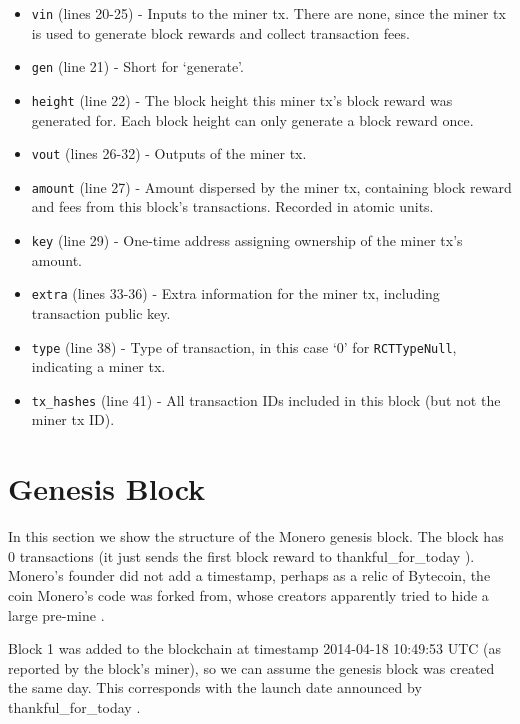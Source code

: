 \begin{appendices}
\begin{itemize}
    \item {\tt vin} (lines 20-25) - Inputs to the miner tx. There are none, since the miner tx is used to generate block rewards and collect transaction fees.
    \item {\tt gen} (line 21) - Short for `generate'.
    \item {\tt height} (line 22) - The block height this miner tx's block reward was generated for. Each block height can only generate a block reward once.
    \item {\tt vout} (lines 26-32) - Outputs of the miner tx.
    \item {\tt amount} (line 27) - Amount dispersed by the miner tx, containing block reward and fees from this block's transactions. Recorded in atomic units.
    \item {\tt key} (line 29) - One-time address assigning ownership of the miner tx's amount.
    \item {\tt extra} (lines 33-36) - Extra information for the miner tx, including transaction public key.
    \item {\tt type} (line 38) - Type of transaction, in this case `0' for {\tt RCTTypeNull}, indicating a miner tx.
    \item {\tt tx\_hashes} (line 41) - All transaction IDs included in this block (but not the miner tx ID).
\end{itemize}




\chapter{Genesis Block}
\label{appendix:genesis-block}

In this section we show the structure of the Monero genesis block. The block has 0 transactions (it just sends the first block reward to thankful\_for\_today \cite{bitmonero-launched}). Monero's founder did not add a timestamp, perhaps as a relic of Bytecoin, the coin Monero's code was forked from, whose creators apparently tried to hide a large pre-mine \cite{monero-history}.

Block 1 was added to the blockchain at timestamp 2014-04-18 10:49:53 UTC (as reported by the block's miner), so we can assume the genesis block was created the same day. This corresponds with the launch date announced by thankful\_for\_today \cite{bitmonero-launched}.


\end{appendices}
